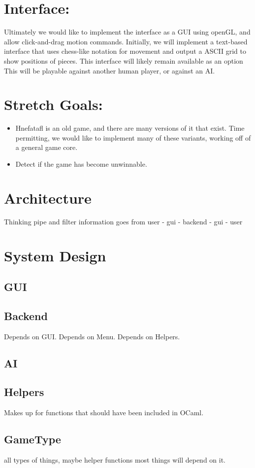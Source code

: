 \documentclass{article}
\begin{document}
\section{Interface:}
Ultimately we would like to implement the interface as a GUI using openGL, and
allow click-and-drag motion commands. Initially, we will implement a text-based
interface that uses chess-like notation for movement and output a ASCII grid to
show positions of pieces. This interface will likely remain available as an
option\\
This will be playable against another human player, or against an AI.
\section{Stretch Goals:}
\begin{itemize}
\item Hnefatafl is an old game, and there are many versions of it that exist.
  Time permitting, we would like to implement many of these variants, working
  off of a general game core.
\item Detect if the game has become unwinnable.
\end{itemize}

\section{Architecture}
Thinking pipe and filter
information goes from user - gui - backend - gui - user

\section{System Design}
\subsection{GUI}
\subsection{Backend}
Depends on GUI.
Depends on Menu.
Depends on Helpers.
\subsection{AI}
\subsection{Helpers}
Makes up for functions that should have been included in OCaml.
\subsection{GameType}
all types of things, maybe helper functions
most things will depend on it.
\end{document}
